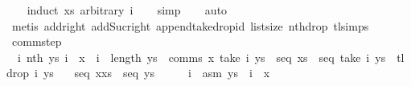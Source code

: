\begin{isabellebody}
%
\isadelimproof
\ \ %
\endisadelimproof
%
\isatagproof
{}\isamarkupfalse%
\ {}induct\ xs\ arbitrary{}\ i{}\isanewline
\ \ \isamarkupfalse%
\ simp\isanewline
\ \ \isamarkupfalse%
\ auto\isanewline
\ \ \isamarkupfalse%
\ {}metis\ add{}{}{}right\ add{}Suc{}right\ append{}take{}drop{}id\ list{}size{}{}{}\ nth{}drop{}\ tl{}simps{}{}{}{}%
\endisatagproof
{\isafoldproof}%
%
\isadelimproof
\isanewline
%
\endisadelimproof
\isanewline
{}\isamarkupfalse%
\ comm{}step{}\isanewline
\ \ \isanewline
\ \ {}{}i{}\ nth\ ys\ i\ {}\ x\ {}\ i\ {}\ length\ ys\ {}\ comms\ x\ {}take\ i\ ys{}\ {}\ seq\ xs\ {}\ seq\ {}take\ i\ ys\ {}\ tl\ {}drop\ i\ ys{}{}{}\isanewline
\ \ \ {}seq\ {}x{}xs{}\ {}\ seq\ ys{}\isanewline
%
\isadelimproof
%
\endisadelimproof
%
\isatagproof
{}\isamarkupfalse%
\ {}\isanewline
\ \ \isamarkupfalse%
\ i\ \ asm{}{}\ {}ys\ {}\ i\ {}\ x{}\isanewline

\end{isabellebody}
